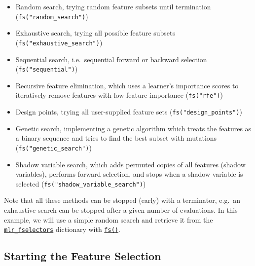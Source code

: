 \begin{itemize}
\tightlist
\item
  Random search, trying random feature subsets until termination
  (\texttt{fs("random\_search")})
\item
  Exhaustive search, trying all possible feature subsets
  (\texttt{fs("exhaustive\_search")})
\item
  Sequential search, i.e.~sequential forward or backward selection
  (\texttt{fs("sequential")})
\item
  Recursive feature elimination, which uses a learner's importance
  scores to iteratively remove features with low feature importance
  (\texttt{fs("rfe")})
\item
  Design points, trying all user-supplied feature sets
  (\texttt{fs("design\_points")})
\item
  Genetic search, implementing a genetic algorithm which treats the
  features as a binary sequence and tries to find the best subset with
  mutations (\texttt{fs("genetic\_search")})
\item
  Shadow variable search, which adds permuted copies of all features
  (shadow variables), performs forward selection, and stops when a
  shadow variable is selected (\texttt{fs("shadow\_variable\_search")})
\end{itemize}

Note that all these methods can be stopped (early) with a terminator,
e.g.~an exhaustive search can be stopped after a given number of
evaluations. In this example, we will use a simple random search and
retrieve it from the
\href{https://mlr3fselect.mlr-org.com/reference/mlr_fselectors.html}{\texttt{mlr\_fselectors}}
dictionary with
\href{https://mlr3fselect.mlr-org.com/reference/fs.html}{\texttt{fs()}}.

\begin{Shaded}
\begin{Highlighting}[]
\OtherTok{=} \NormalTok{(}\NormalTok{)}
\end{Highlighting}
\end{Shaded}

\hypertarget{starting-the-feature-selection}{%
\subsection{Starting the Feature Selection}\label{starting-the-feature-selection}}

